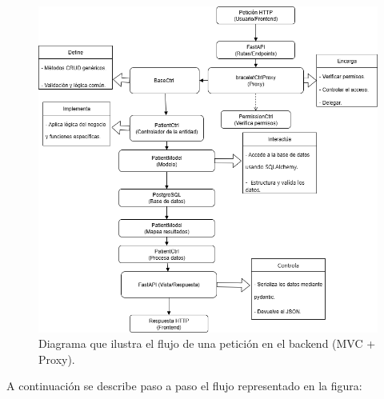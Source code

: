 \documentclass[12pt, a4paper]{article}
\begin{document}
\begin{figure}[htbp]
	\centering
	\includegraphics[width=\textwidth]{images/diagrama.png}
	\caption[Diagrama del flujo MVC + Proxy]{Diagrama que ilustra el flujo de una petición en el backend (MVC + Proxy).}
	\label{fig:diagrama}
\end{figure}

A continuación se describe paso a paso el flujo representado en la figura:
\end{document}
